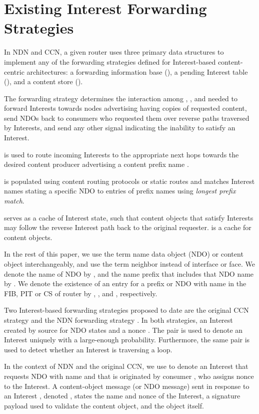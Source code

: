 \documentclass{ancs15-alternate}
\begin{document}
\section{Existing Interest Forwarding \\ Strategies }
\label{sec-prev}

In NDN and CCN, a given router  uses three primary data structures to implement any of the forwarding strategies defined for  Interest-based content-centric architectures: a forwarding information base (),  a pending Interest table (), and a content store (). 

The forwarding strategy determines the  interaction among , , and  needed to forward Interests towards nodes advertising having copies of requested content, send NDOs back to consumers who requested them over reverse paths traversed by Interests, and send any other signal indicating the inability to satisfy an Interest. 

 is used to route incoming Interests to the appropriate next hops towards the desired content producer advertising a content prefix name . 

 is populated using content routing protocols or static routes and matches Interest names stating a specific NDO   to  entries of prefix names using \emph{longest prefix match}. 

 serves as a cache of Interest state, such that content objects that satisfy Interests may follow the reverse Interest path back to the original requester. 
 is a cache for content objects.

In the rest of this paper, we use the term name data object (NDO) or content object interchangeably, and  use the term neighbor instead of interface or face.
We denote the name of NDO  by , and the name prefix that includes that NDO name by .
We denote the existence of  an entry for a prefix  or NDO with name  in the FIB, PIT or CS of router  by , , and , respectively.


Two Interest-based forwarding strategies proposed to date  are the original CCN strategy \cite{ccn} and the  NDN forwarding strategy \cite{ndn-fw, ndn-paper}. In both strategies,  an Interest created by source  for NDO  states   and a nonce . The pair   is used to denote an Interest uniquely with a large-enough probability. Furthermore, the same pair is used to detect whether an Interest is traversing a loop. 

In the context of NDN and the original CCN, we use  to denote  an Interest that requests NDO with name   and that is originated by consumer , who  assigns nonce  to the Interest.  A content-object message (or NDO message) sent in response to an Interest , denoted , states the name and nonce of the Interest, a signature payload  used to validate the content object, and the object itself. 
 
\end{document}
